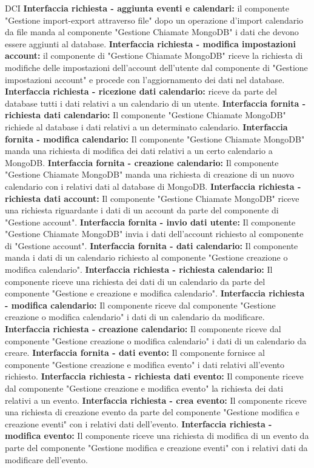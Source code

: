 \begin{listaPersonale}{DCI}
    \textbf{Interfaccia richiesta - aggiunta eventi e calendari:} il componente "Gestione import-export attraverso file" dopo un operazione d'import calendario da file manda al componente "Gestione Chiamate MongoDB" i dati che devono essere aggiunti al database.
    \textbf{Interfaccia richiesta - modifica impostazioni account:} il componente di "Gestione Chiamate MongoDB" riceve la richiesta di modifiche delle impostazioni dell'account dell'utente dal componente di "Gestione impostazioni account" e procede con l'aggiornamento dei dati nel database.
    \textbf{Interfaccia richiesta - ricezione dati calendario:} riceve da parte del database tutti i dati relativi a un calendario di un utente.
    \textbf{Interfaccia fornita - richiesta dati calendario:} Il componente "Gestione Chiamate MongoDB" richiede al database i dati relativi a un determinato calendario.
    \textbf{Interfaccia fornita - modifica calendario:} Il componente "Gestione Chiamate MongoDB" manda una richiesta di modifica dei dati relativi a un certo calendario a MongoDB.
    \textbf{Interfaccia fornita - creazione calendario:} Il componente "Gestione Chiamate MongoDB" manda una richiesta di creazione di un nuovo calendario con i relativi dati al database di MongoDB.
    \textbf{Interfaccia richiesta - richiesta dati account:} Il componente "Gestione Chiamate MongoDB" riceve una richiesta riguardante i dati di un account da parte del componente di "Gestione account".
    \textbf{Interfaccia fornita - invio dati utente:} Il componente "Gestione Chiamate MongoDB" invia i dati dell'account richiesto al componente di "Gestione account".
    \textbf{Interfaccia fornita - dati calendario:} Il componente manda i dati di un calendario richiesto al componente "Gestione creazione o modifica calendario".
    \textbf{Interfaccia richiesta - richiesta calendario:} Il componente riceve una richiesta dei dati di un calendario da parte del componente "Gestione e creazione e modifica calendario".
    \textbf{Interfaccia richiesta - modifica calendario:} Il componente riceve dal componente "Gestione creazione o modifica calendario" i dati di un calendario da modificare.
    \textbf{Interfaccia richiesta  - creazione calendario:} Il componente riceve dal componente "Gestione creazione o modifica calendario" i dati di un calendario da creare.
    \textbf{Interfaccia fornita - dati evento:} Il componente fornisce al componente "Gestione creazione e modifica evento" i dati relativi all'evento richiesto.
    \textbf{Interfaccia richiesta - richiesta dati evento:} Il componente riceve dal componente "Gestione creazione e modifica evento" la richiesta dei dati relativi a un evento.
    \textbf{Interfaccia richiesta - crea evento:} Il componente riceve una richiesta di creazione evento da parte del componente "Gestione modifica e creazione eventi" con i relativi dati dell'evento.
    \textbf{Interfaccia richiesta - modifica evento:} Il componente riceve una richiesta di modifica di un evento da parte del componente "Gestione modifica e creazione eventi" con i relativi dati da modificare dell'evento.





\end{listaPersonale}
